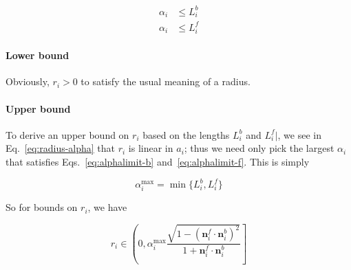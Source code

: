 \documentclass{article}
\begin{document}
\begin{align}
  \label{eq:alphalimit-b}
  \alpha_i &\le L^{b}_{i}\\
  \label{eq:alphalimit-f}
  \alpha_i &\le L^{f}_{i}
\end{align}

\paragraph{Lower bound}

Obviously, $r_i > 0$ to satisfy the usual meaning of a radius.

\paragraph{Upper bound}

To derive an upper bound on $r_{i}$ based on the lengths $L^b_i$ and $L^f_i|$,  we see in Eq.~\eqref{eq:radius-alpha} that $r_{i}$ is linear in $a_{i}$; thus we need only pick the largest $\alpha_i$ that satisfies Eqs.~\eqref{eq:alphalimit-b} and~\eqref{eq:alphalimit-f}.  This is simply

\begin{equation}
  \label{eq:alpha-max}
  \alpha^{\max}_i = \min \{L^{b}_{i}, L^{f}_{i}\}
\end{equation}

So for bounds on $r_{i}$, we have

\begin{equation}
  \label{eq:rbounds}
  r_{i} \in \left(0, \alpha^{\max}_i \frac{\sqrt{1-\left(\mathbf{n}^f_i\cdot \mathbf{n}^b_i\right)^{2}}}{1+\mathbf{n}^f_i\cdot \mathbf{n}^b_i}\right]
\end{equation}
\end{document}
